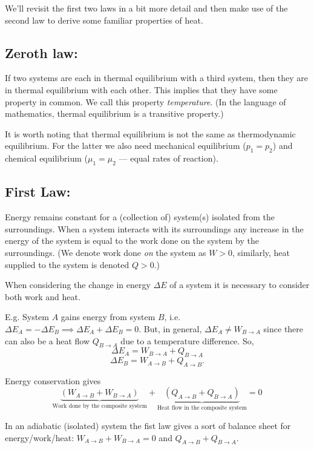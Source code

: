 \documentclass{article}
\begin{document}
We'll revisit the first two laws in a bit more detail and then make use of the second law to derive some familiar properties of heat.

\subsection*{Zeroth law:}
If two systems are each in thermal equilibrium with a third system, then they are in thermal equilibrium with each other. This implies that they have some property in common. We call this property \emph{temperature}. (In the language of mathematics, thermal equilibrium is a transitive property.)

It is worth noting that thermal equilibrium is not the same as thermodynamic equilibrium. For the latter we also need mechanical equilibrium ($p_1=p_2$) and chemical equilibrium ($\mu_1=\mu_2$ --- equal rates of reaction).

\subsection*{First Law:}
Energy remains constant for a (collection of) system(s) isolated from the surroundings. When a system interacts with its surroundings any increase in the energy of the system is equal to the work done on the system by the surroundings. (We denote work done \emph{on} the system as $W>0$, similarly, heat supplied to the system is denoted $Q>0$.)

When considering the change in energy $\Delta E$ of a system it is necessary to consider both work and heat.

E.g. System $A$ gains energy from system $B$, i.e. $\Delta E_A = -\Delta E_B \implies \Delta E_A + \Delta E_B =0$. But, in general, $\Delta E_A\neq W_{B\rightarrow A}$ since there can also be a heat flow $Q_{B\rightarrow A}$ due to a temperature difference.
So,
$$\Delta E_A = W_{B\rightarrow A} + Q_{B\rightarrow A}$$
$$\Delta E_B = W_{A\rightarrow B} + Q_{A\rightarrow B}.$$

Energy conservation gives 
$$\underbrace{(W_{A\rightarrow B}+W_{B\rightarrow A})}_{\text{Work done by the composite system}} + \underbrace{(Q_{A\rightarrow B}+Q_{B\rightarrow A})}_{\text{Heat flow in the composite system}} = 0$$

In an adiabatic (isolated) system the fist law gives a sort of balance sheet for energy/work/heat:
$W_{A\rightarrow B}+W_{B\rightarrow A} = 0$ and $Q_{A\rightarrow B}+Q_{B\rightarrow A}$.
\end{document}
